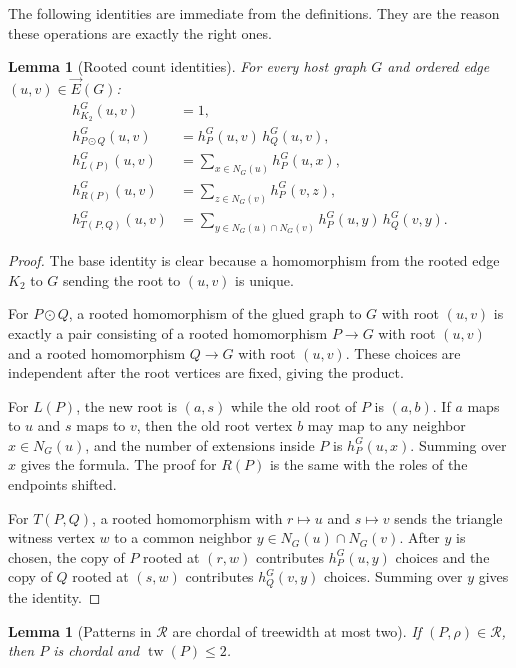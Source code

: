 \documentclass[11pt]{article}
\newtheorem{lemma}[theorem]{Lemma}
\DeclareMathOperator{\tw}{tw}
\newcommand{\cR}{\mathcal{R}}
\newcommand{\vecE}{\overrightarrow{E}}
\begin{document}
The following identities are immediate from the definitions.  They are the reason these operations are exactly the right ones.

\begin{lemma}[Rooted count identities]
\label{lem:rooted-identities}
For every host graph $G$ and ordered edge $(u,v)\in\vecE(G)$:
\begin{align*}
h_{K_2}^G(u,v)&=1,\\
h_{P\odot Q}^G(u,v)&=h_P^G(u,v)\,h_Q^G(u,v),\\
h_{L(P)}^G(u,v)&=\sum_{x\in N_G(u)} h_P^G(u,x),\\
h_{R(P)}^G(u,v)&=\sum_{z\in N_G(v)} h_P^G(v,z),\\
h_{T(P,Q)}^G(u,v)&=\sum_{y\in N_G(u)\cap N_G(v)} h_P^G(u,y)\,h_Q^G(v,y).
\end{align*}
\end{lemma}

\begin{proof}
The base identity is clear because a homomorphism from the rooted edge $K_2$ to $G$ sending the root to $(u,v)$ is unique.

For $P\odot Q$, a rooted homomorphism of the glued graph to $G$ with root $(u,v)$ is exactly a pair consisting of a rooted homomorphism $P\to G$ with root $(u,v)$ and a rooted homomorphism $Q\to G$ with root $(u,v)$.  These choices are independent after the root vertices are fixed, giving the product.

For $L(P)$, the new root is $(a,s)$ while the old root of $P$ is $(a,b)$.  If $a$ maps to $u$ and $s$ maps to $v$, then the old root vertex $b$ may map to any neighbor $x\in N_G(u)$, and the number of extensions inside $P$ is $h_P^G(u,x)$.  Summing over $x$ gives the formula.  The proof for $R(P)$ is the same with the roles of the endpoints shifted.

For $T(P,Q)$, a rooted homomorphism with $r\mapsto u$ and $s\mapsto v$ sends the triangle witness vertex $w$ to a common neighbor $y\in N_G(u)\cap N_G(v)$.  After $y$ is chosen, the copy of $P$ rooted at $(r,w)$ contributes $h_P^G(u,y)$ choices and the copy of $Q$ rooted at $(s,w)$ contributes $h_Q^G(v,y)$ choices.  Summing over $y$ gives the identity.
\end{proof}

\begin{lemma}[Patterns in $\cR$ are chordal of treewidth at most two]
\label{lem:R-chordal}
If $(P,\rho)\in\cR$, then $P$ is chordal and $\tw(P)\leq 2$.
\end{lemma}
\end{document}
